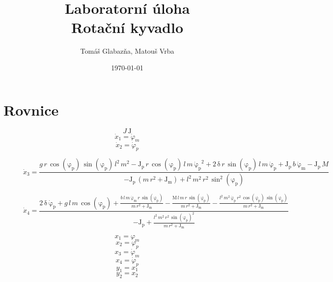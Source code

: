 \documentclass[11pt,a4paper]{article}
\title{%
  Laboratorní úloha \\
  \large Rotační kyvadlo}
\author{Tomáš Glabazňa, Matouš Vrba}
\date{\today}
\begin{document}
\maketitle

\newcommand{\xd}[1]{\dot{x}_{#1}} %
\newcommand{\phid}[1]{\dot{\varphi}_{#1}}
\newcommand{\phin}[1]{\varphi_{#1}} %

\section*{Rovnice}
$$
J \, \mathrm{J}
$$
$$
\xd{1} = \phid{m}
$$
$$
\xd{2} = \phid{p}
$$

\begin{figure}[H]
\begin{equation}
\xd{3} = \frac{g\, r\, \cos\!\left(\mathrm{\phin{p}}\right)\, \sin\!\left(\mathrm{\phin{p}}\right)\, l^2\, m^2 - \mathrm{J_p}\, r\, \cos\!\left(\mathrm{\phin{p}}\right)\, l\, m\, {\mathrm{\phid{p}}}^2 + 2\, \mathrm{\delta}\, r\, \sin\!\left(\mathrm{\phin{p}}\right)\, l\, m\, \mathrm{\phid{p}} + \mathrm{J_p}\, b\, \mathrm{\phid{m}} - \mathrm{J_p}\, M}{- \mathrm{J_p}\, \left(m\, r^2 + \mathrm{J_m}\right) + l^2\, m^2\, r^2\, \sin^2\!\left(\mathrm{\phin{p}}\right)}
\end{equation}
\end{figure}

\begin{figure}[H]
\begin{equation}
\xd{4} = \frac{2\, \mathrm{\delta}\, \mathrm{\phid{p}} + g\, l\, m\, \cos\!\left(\mathrm{\phin{p}}\right) + \frac{b\, l\, m\, \mathrm{\phid{m}}\, r\, \sin\!\left(\mathrm{\phin{p}}\right)}{m\, r^2 + \mathrm{J_m}} - \frac{\mathrm{M}\, l\, m\, r\, \sin\!\left(\mathrm{\phin{p}}\right)}{m\, r^2 + \mathrm{J_m}} - \frac{l^2\, m^2\, \mathrm{\phid{p}}\, r^2\, \cos\!\left(\mathrm{\phin{p}}\right)\, \sin\!\left(\mathrm{\phin{p}}\right)}{m\, r^2 + \mathrm{J_m}}}{-\mathrm{J_p} + \frac{l^2\, m^2\, r^2\, {\sin\!\left(\mathrm{\phin{p}}\right)}^2}{m\, r^2 + \mathrm{J_m}}}
\end{equation}
\end{figure}




$$
x_1 = \phin{m}
$$
$$
x_2 = \phin{p}
$$
$$
x_3 = \phid{m}
$$
$$
x_4 = \phid{p}
$$
$$
y_1 = x_1
$$
$$
y_2 = x_2
$$
\end{document}
